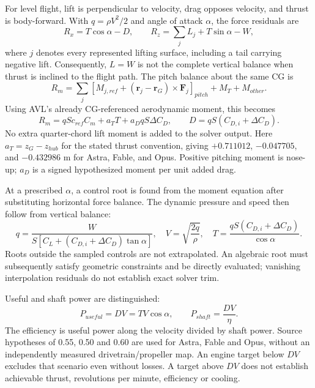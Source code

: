 \documentclass[11pt,a4paper]{article}
\begin{document}
For level flight, lift is perpendicular to velocity, drag opposes velocity, and thrust is body-forward. With $q=\rho V^2/2$ and angle of attack $\alpha$, the force residuals are
\begin{equation}
R_x=T\cos\alpha-D,\qquad
R_z=\sum_j L_j+T\sin\alpha-W,
\label{eq:forces}
\end{equation}
where $j$ denotes every represented lifting surface, including a tail carrying negative lift. Consequently, $L=W$ is not the complete vertical balance when thrust is inclined to the flight path. The pitch balance about the same CG is
\begin{equation}
R_m=\sum_j\left[M_{j,ref}+(\boldsymbol r_j-\boldsymbol r_G)\times\boldsymbol F_j\right]_{pitch}
+M_T+M_{other}.
\label{eq:moments}
\end{equation}
Using AVL's already CG-referenced aerodynamic moment, this becomes
\begin{equation}
R_m=qSc_{ref}C_m+a_TT+a_DqS\Delta C_D,
\qquad D=qS(C_{D,i}+\Delta C_D).
\label{eq:solvermoment}
\end{equation}
No extra quarter-chord lift moment is added to the solver output. Here $a_T=z_G-z_{hub}$ for the stated thrust convention, giving $+0.711012$, $-0.047705$, and $-0.432986$ m for Astra, Fable, and Opus. Positive pitching moment is nose-up; $a_D$ is a signed hypothesized moment per unit added drag.

At a prescribed $\alpha$, a control root is found from the moment equation after substituting horizontal force balance. The dynamic pressure and speed then follow from vertical balance:
\begin{equation}
q=\frac{W}{S[C_L+(C_{D,i}+\Delta C_D)\tan\alpha]},\quad
V=\sqrt{\frac{2q}{\rho}},\quad
T=\frac{qS(C_{D,i}+\Delta C_D)}{\cos\alpha}.
\label{eq:trim}
\end{equation}
Roots outside the sampled controls are not extrapolated. An algebraic root must subsequently satisfy geometric constraints and be directly evaluated; vanishing interpolation residuals do not establish exact solver trim.

Useful and shaft power are distinguished:
\begin{equation}
P_{useful}=DV=TV\cos\alpha,\qquad
P_{shaft}=\frac{DV}{\eta}.
\label{eq:power}
\end{equation}
The efficiency is useful power along the velocity divided by shaft power. Source hypotheses of 0.55, 0.50 and 0.60 are used for Astra, Fable and Opus, without an independently measured drivetrain/propeller map. An engine target below $DV$ excludes that scenario even without losses. A target above $DV$ does not establish achievable thrust, revolutions per minute, efficiency or cooling.
\end{document}

